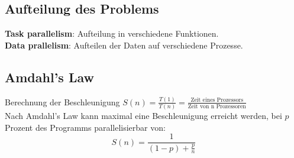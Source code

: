 \subsection{Aufteilung des Problems}
\textbf{Task parallelism}: Aufteilung in verschiedene Funktionen.\\
\textbf{Data prallelism}: Aufteilen der Daten auf verschiedene Prozesse.\\


\subsection{Amdahl's Law}
Berechnung der Beschleunigung \(S(n) = \frac{T(1)}{T(n)} = \frac{\text{Zeit eines Prozessors}}{\text{Zeit von n Prozessoren}}\)\\
Nach Amdahl's Law kann maximal eine Beschleunigung erreicht werden, bei \(p\) Prozent des Programms parallelisierbar von:
\[S(n) = \frac{1}{(1-p) + \frac{p}{n}}\]